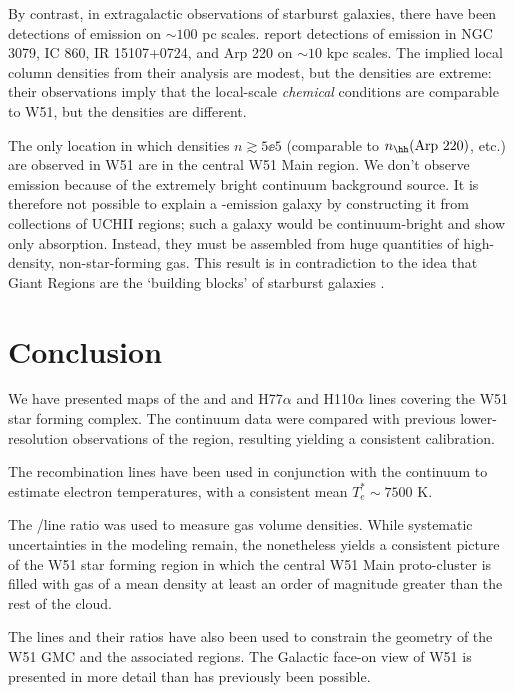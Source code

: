 By contrast, in extragalactic observations of starburst galaxies, there have
been detections of emission on $\sim100$ pc scales.  \citet{Mangum2013a} report
detections of \formaldehyde \oneone emission in NGC 3079, IC 860, IR
15107+0724, and Arp 220 on $\sim10$ kpc scales.  The implied local column
densities from their analysis are modest, but the densities are extreme: their
observations imply that the local-scale \emph{chemical} conditions are
comparable to W51, but the densities are different.

The only location in which densities $n\gtrsim5\ee{5}$ \percc (comparable to
$n_{\hh}(\textrm{Arp } 220)$, etc.) are observed in W51 are in the central W51
Main region.  We don't observe emission because of the extremely bright
continuum background source.  It is therefore not possible to explain a
\formaldehyde-emission galaxy by constructing it from collections of UCHII
regions; such a galaxy would be continuum-bright and show only \formaldehyde
absorption.  Instead, they must be assembled from huge quantities of
high-density, non-star-forming gas.  This result is in contradiction to the
idea that Giant \hii Regions are the `building blocks' of starburst galaxies
\citep[e.g.][]{Miura2014a}.  


\section{Conclusion}
We have presented maps of the \formaldehyde \oneone and \twotwo and H77$\alpha$
and H110$\alpha$ lines covering the W51 star forming complex.  The continuum
data were compared with previous lower-resolution observations of the region,
resulting yielding a consistent calibration.

The recombination lines have been used in conjunction with the continuum to
estimate electron temperatures, with a consistent mean $T_e^*\sim7500$ K.

The \formaldehyde \oneone/\twotwo line ratio was used to measure gas volume
densities.  While systematic uncertainties in the modeling remain, the
\formaldehyde nonetheless yields a consistent picture of the W51 star forming
region in which the central W51 Main proto-cluster is filled with gas of a mean
density at least an order of magnitude greater than the rest of the cloud.

The \formaldehyde lines and their ratios have also been used to constrain the
geometry of the W51 GMC and the associated \hii regions.  The Galactic face-on
view of W51 is presented in more detail than has previously been possible.

